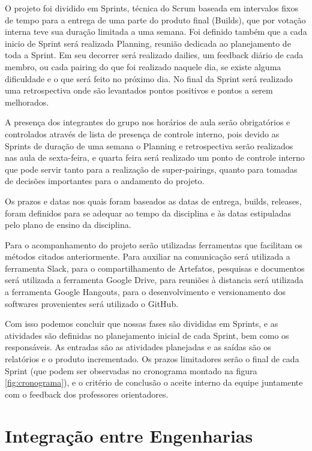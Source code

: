O projeto foi dividido em Sprints, técnica do Scrum baseada em intervalos fixos de tempo para a entrega de uma parte do produto final (Builds), que por votação interna teve sua duração limitada a uma semana. Foi definido também que a cada inicio de Sprint será realizada Planning, reunião dedicada ao planejamento de toda a Sprint. Em seu decorrer será realizado dailies, um feedback diário de cada membro, ou cada pairing do que foi realizado naquele dia, se existe alguma dificuldade e o que será feito no próximo dia. No final da Sprint será realizado uma retrospectiva onde são levantados pontos positivos e pontos a serem melhorados.

A presença dos integrantes do grupo nos horários de aula serão obrigatórios e controlados através de lista de presença de controle interno, pois devido as Sprints de duração de uma semana o Planning e retrospectiva serão realizados nas aula de sexta-feira, e quarta feira será realizado um ponto de controle interno que pode servir tanto para a realização de super-pairings, quanto para tomadas de decisões importantes para o andamento do projeto.

Os prazos e datas nos quais foram baseados as datas de entrega, builds, releases, foram definidos para se adequar ao tempo da disciplina e às datas estipuladas pelo plano de ensino da disciplina.

Para o acompanhamento do projeto serão utilizadas ferramentas que facilitam os métodos citados anteriormente. Para auxiliar na comunicação será utilizada a ferramenta Slack, para o compartilhamento de Artefatos, pesquisas e documentos será utilizada a ferramenta Google Drive, para reuniões à distancia será utilizada a ferramenta Google Hangouts, para o desenvolvimento  e versionamento dos softwares provenientes será utilizado o GitHub.

Com isso podemos concluir que nossas fases são divididas em Sprints, e as atividades são definidas no planejamento inicial de cada Sprint, bem como os responsáveis. As entradas são as atividades planejadas e as saídas são os relatórios e o produto incrementado. Os prazos limitadores serão o final de cada Sprint (que podem ser observadas no cronograma montado na figura \ref{fig:cronograma}), e o critério de conclusão o aceite interno da equipe juntamente com o feedback dos professores orientadores.

\section{Integração entre Engenharias}


